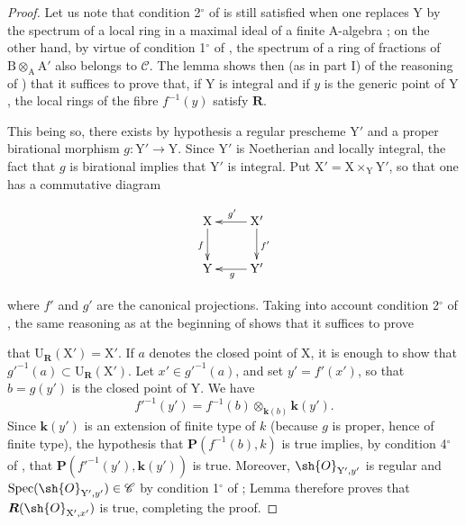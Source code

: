 \begin{proof}
Let us note that condition 2${}^\circ$ of  is still satisfied when one replaces $\mathrm{Y}$ by the spectrum of a local ring in a maximal ideal of a finite $\mathrm{A}$-algebra ; on the other hand, by virtue of condition 1${}^\circ$ of , the spectrum of a ring of fractions of $\mathrm{B}\otimes_\mathrm{A}\mathrm{A}'$ also belongs to $\mathcal{C}$. The lemma  shows then (as in part I) of the reasoning of ) that it suffices to prove that, if $\mathrm{Y}$ is integral and if $y$ is the generic point of $\mathrm{Y}$, the local rings of the fibre $f^{-1}(y)$ satisfy $\boldsymbol{R}$.

This being so, there exists by hypothesis a regular prescheme $\mathrm{Y}'$ and a proper birational morphism $g:\mathrm{Y}'\to\mathrm{Y}$. Since $\mathrm{Y}'$ is Noetherian and locally integral, the fact that $g$ is birational implies that $\mathrm{Y}'$ is integral. Put $\mathrm{X}'=\mathrm{X}\times_\mathrm{Y}\mathrm{Y}'$, so that one has a commutative diagram

\begin{env}[7.9.8.1]
\label{IV.7.9.8.1}
\[
  \xymatrix{
    \mathrm{X} \ar[d]_f & \mathrm{X}' \ar[l]_{g'} \ar[d]^{f'} \\
    \mathrm{Y} & \mathrm{Y}' \ar[l]^g
  }
\]
\end{env}

where $f'$ and $g'$ are the canonical projections. Taking into account condition 2${}^\circ$ of , the same reasoning as at the beginning of  shows that it suffices to prove


that $\mathrm{U}_{\boldsymbol{R}}(\mathrm{X}')=\mathrm{X}'$. If $a$ denotes the closed point of $\mathrm{X}$, it is enough to show that $g'^{-1}(a)\subset\mathrm{U}_{\boldsymbol{R}}(\mathrm{X}')$. Let $x'\in g'^{-1}(a)$, and set $y'=f'(x')$, so that $b=g(y')$ is the closed point of $\mathrm{Y}$. We have
\[
  f'^{-1}(y')=f^{-1}(b)\otimes_{\boldsymbol{k}(b)}\boldsymbol{k}(y').
\]
Since $\boldsymbol{k}(y')$ is an extension of finite type of $k$ (because $g$ is proper, hence of finite type), the hypothesis that $\boldsymbol{P}(f^{-1}(b),k)$ is true implies, by condition 4${}^\circ$ of , that $\boldsymbol{P}(f'^{-1}(y'),\boldsymbol{k}(y'))$ is true. Moreover, $\sh{O}_{\mathrm{Y}',y'}$ is regular and $\operatorname{Spec}(\sh{O}_{\mathrm{Y}',y'})\in\mathcal{C}$ by condition 1${}^\circ$ of ; Lemma  therefore proves that $\boldsymbol{R}(\sh{O}_{\mathrm{X}',x'})$ is true, completing the proof.
\end{proof}

